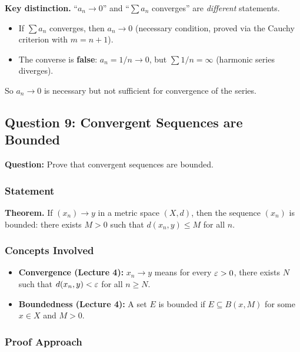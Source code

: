 \documentclass[../master/master.tex]{subfiles}
\begin{document}
\begin{notebox}
\textbf{Key distinction.} ``$a_n \to 0$'' and ``$\sum a_n$ converges'' are \emph{different} statements.
\begin{itemize}
    \item If $\sum a_n$ converges, then $a_n \to 0$ (necessary condition, proved via the Cauchy criterion with $m = n+1$).
    \item The converse is \textbf{false}: $a_n = 1/n \to 0$, but $\sum 1/n = \infty$ (harmonic series diverges).
\end{itemize}
So $a_n \to 0$ is necessary but not sufficient for convergence of the series.
\end{notebox}

\newpage
\subsection{Question 9: Convergent Sequences are Bounded}

\begin{summarybox}
\textbf{Question:} Prove that convergent sequences are bounded.
\end{summarybox}

\subsubsection*{Statement}

\textbf{Theorem.} If $(x_n) \to y$ in a metric space $(X, d)$, then the sequence $(x_n)$ is bounded: there exists $M > 0$ such that $d(x_n, y) \leq M$ for all $n$.

\subsubsection*{Concepts Involved}

\begin{itemize}
    \item \textbf{Convergence (Lecture 4):} $x_n \to y$ means for every $\varepsilon > 0$, there exists $N$ such that $d(x_n, y) < \varepsilon$ for all $n \geq N$.
    \item \textbf{Boundedness (Lecture 4):} A set $E$ is bounded if $E \subseteq B(x, M)$ for some $x \in X$ and $M > 0$.
\end{itemize}

\subsubsection*{Proof Approach}
\end{document}
